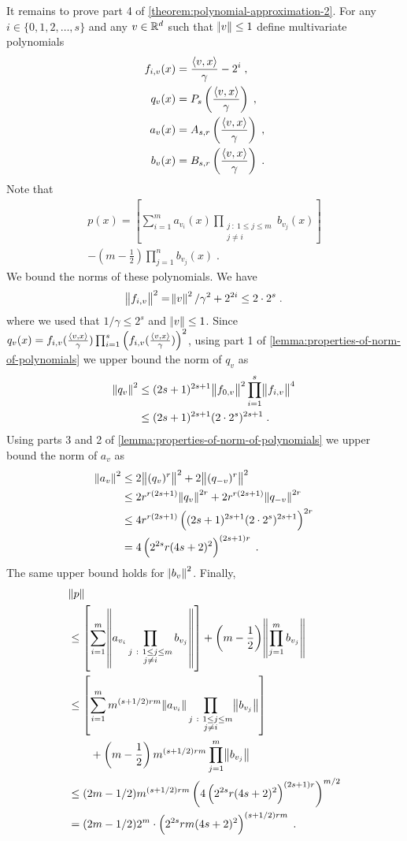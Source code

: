 It remains to prove part 4 of \autoref{theorem:polynomial-approximation-2}.
For any $i \in \{0,1,2,\dots,s\}$ and any $v \in \mathbb{R}^d$ such that $\norm{v} \le 1$
define multivariate polynomials
\begin{align*}
f_{i,v}(x) & = \frac{\left\langle v, x \right\rangle}{\gamma} - 2^i \; , \\
q_v(x) & = P_s \left( \frac{\left\langle v, x \right\rangle}{\gamma} \right) \; , \\
a_v(x) & = A_{s,r} \left( \frac{\left\langle v, x \right\rangle}{\gamma} \right) \; , \\
b_v(x) & = B_{s,r} \left( \frac{\left\langle v, x \right\rangle}{\gamma} \right) \; .
\end{align*}
Note that
\begin{multline*}
p(x) = \left[ \sum_{i=1}^m a_{v_i}(x) \prod_{\substack{j ~:~ 1 \le j \le m \\ j \neq i}} b_{v_j}(x) \right]  \\
- \left(m - \frac{1}{2} \right) \prod_{j=1}^n b_{v_j}(x) \; .
\end{multline*}
We bound the norms of these polynomials. We have
$$
\norm{f_{i,v}}^2 = \norm{v}^2/\gamma^2 + 2^{2i} \le 2 \cdot 2^s \; .
$$
where we used that $1/\gamma \le 2^s$ and $\norm{v} \le 1$.
Since $q_v(x) = f_{i,v}(\frac{\left\langle v, x \right\rangle}{\gamma}) \prod_{i=1}^s \left(f_{i,v}(\frac{\left\langle v, x \right\rangle}{\gamma})\right)^2$,
using part 1 of \autoref{lemma:properties-of-norm-of-polynomials} we upper bound the norm of $q_v$
as
\begin{align*}
\norm{q_v}^2
& \le (2s+1)^{2s+1} \norm{f_{0,v}}^2 \prod_{i=1}^s \norm{f_{i,v}}^4 \\
& \le  (2s+1)^{2s+1} (2 \cdot 2^s)^{2s + 1} \; .
\end{align*}
Using parts 3 and 2 of \autoref{lemma:properties-of-norm-of-polynomials} we upper bound the norm of $a_v$ as
\begin{align*}
\norm{a_v}^2
& \le 2\norm{(q_v)^r}^2 + 2\norm{(q_{-v})^r}^2 \\
& \le 2 r^{r(2s+1)} \norm{q_v}^{2r} + 2 r^{r(2s+1)} \norm{q_{-v}}^{2r} \\
& \le 4 r^{r(2s+1)} \left((2s+1)^{2s+1} (2 \cdot 2^s)^{2s + 1} \right)^{2r} \\
& = 4 \left(2^{2s} r (4s+2)^2 \right)^{(2s+1)r} \; .
\end{align*}
The same upper bound holds for $\norm{b_v}^2$. Finally,
\begin{align*}
& \norm{p} \\
& \le \left[ \sum_{i=1}^m \norm{a_{v_i} \prod_{\substack{j ~:~ 1 \le j \le m \\ j \neq i}} b_{v_j}} \right] + \left(m - \frac{1}{2} \right) \norm{\prod_{j=1}^m b_{v_j}} \\
& \le \left[ \sum_{i=1}^m m^{(s+1/2)rm} \norm{a_{v_i}} \prod_{\substack{j ~:~ 1 \le j \le m \\ j \neq i}} \norm{b_{v_j}} \right] \\
& \qquad + \left(m - \frac{1}{2} \right) m^{(s+1/2)rm} \prod_{j=1}^m \norm{b_{v_j}} \\
& \le (2m-1/2) m^{(s+1/2)rm} \left(4 \left(2^{2s} r (4s+2)^2 \right)^{(2s+1)r} \right)^{m/2} \\
& = (2m-1/2) 2^m \cdot \left(2^{2s} rm (4s+2)^2 \right)^{(s+1/2)rm} \; .
\end{align*}
